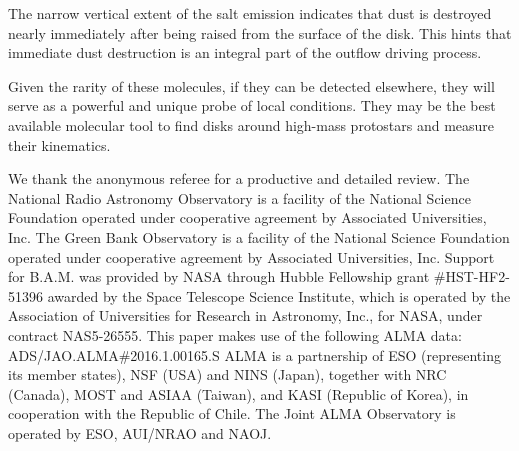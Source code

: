 \documentclass[twocolumn]{aastex62}
\begin{document}
The narrow vertical extent of the salt emission indicates that dust is
destroyed nearly immediately after being raised from the surface of the disk.
This hints that immediate dust destruction is an integral part of the outflow
driving process.

Given the rarity of these molecules, if they can be detected elsewhere,
they will serve as a powerful and unique probe of local conditions.
They may be the best available molecular tool to find disks around high-mass
protostars and measure their kinematics.  



\acknowledgements
We thank the anonymous referee for a productive and detailed review.
The National Radio Astronomy Observatory is a facility of the National Science
Foundation operated under cooperative agreement by Associated Universities,
Inc. The Green Bank Observatory is a facility of the National Science
Foundation operated under cooperative agreement by Associated Universities,
Inc. Support for B.A.M. was provided by NASA through Hubble Fellowship grant
\#HST-HF2-51396 awarded by the Space Telescope Science Institute, which is
operated by the Association of Universities for Research in Astronomy, Inc.,
for NASA, under contract NAS5-26555. 
This paper makes use of the following ALMA data: ADS/JAO.ALMA\#2016.1.00165.S
ALMA is a partnership of ESO (representing its member states), NSF (USA) and
NINS (Japan), together with NRC (Canada), MOST and ASIAA (Taiwan), and KASI
(Republic of Korea), in cooperation with the Republic of Chile. The Joint ALMA
Observatory is operated by ESO, AUI/NRAO and NAOJ.




\end{document}
